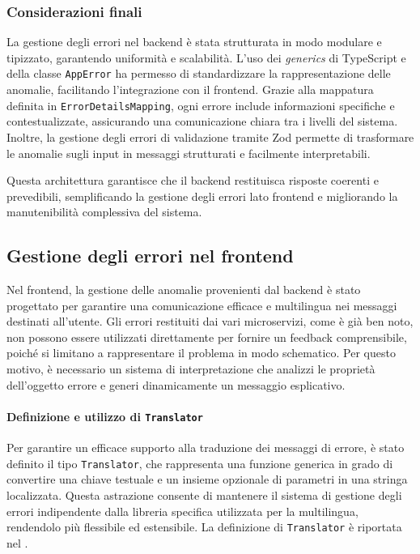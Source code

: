 \subsubsection{Considerazioni finali}
La gestione degli errori nel backend è stata strutturata in modo modulare e tipizzato, garantendo uniformità e scalabilità. L’uso dei \textit{generics} di TypeScript e della classe \texttt{AppError} ha permesso di standardizzare la rappresentazione delle anomalie, facilitando l’integrazione con il frontend.
%
Grazie alla mappatura definita in \texttt{ErrorDetailsMapping}, ogni errore include informazioni specifiche e contestualizzate, assicurando una comunicazione chiara tra i livelli del sistema. Inoltre, la gestione degli errori di validazione tramite Zod permette di trasformare le anomalie sugli input in messaggi strutturati e facilmente interpretabili.

Questa architettura garantisce che il backend restituisca risposte coerenti e prevedibili, semplificando la gestione degli errori lato frontend e migliorando la manutenibilità complessiva del sistema.

\subsection{Gestione degli errori nel frontend}
Nel frontend, la gestione delle anomalie provenienti dal backend è stato progettato per garantire una comunicazione efficace e multilingua nei messaggi destinati all’utente. Gli errori restituiti dai vari microservizi, come è già ben noto, non possono essere utilizzati direttamente per fornire un feedback comprensibile, poiché si limitano a rappresentare il problema in modo schematico. Per questo motivo, è necessario un sistema di interpretazione che analizzi le proprietà dell'oggetto errore e generi dinamicamente un messaggio esplicativo.


\paragraph{Definizione e utilizzo di \texttt{Translator}}
Per garantire un efficace supporto alla traduzione dei messaggi di errore, è stato definito il tipo \texttt{Translator}, che rappresenta una funzione generica in grado di convertire una chiave testuale e un insieme opzionale di parametri in una stringa localizzata. Questa astrazione consente di mantenere il sistema di gestione degli errori indipendente dalla libreria specifica utilizzata per la multilingua, rendendolo più flessibile ed estensibile. La definizione di \texttt{Translator} è riportata nel .

